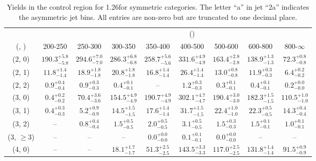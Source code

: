\begin{table}[h!]
\tiny
\centering
\caption{Yields in the \mj control region for 1.26\ifb for symmetric categories. The letter ``a'' in jet \eg ``2a''  indicates the asymmetric jet bins. All entries are non-zero but are truncated to one decimal place.\label{tab:yieldssep_mu_wjetstolnuht_sym}}
\begin{tabular}
{ccccccccc}
	\hline\hline
&	& \multicolumn{8}{c}{\scalht (\gev)} \\ 
	 (\njet,  \nb) & 200-250 & 250-300 & 300-350 & 350-400 & 400-500 & 500-600 & 600-800 & 800-$\infty$ \\ [0.8ex] 
\hline
	(2, 0) & $190.3^{+ 5.8 }_{- 5.8 }$ & $294.6^{+ 7.0 }_{- 7.0 }$ & $286.3^{+ 6.8 }_{- 6.8 }$ & $258.7^{+ 5.6 }_{- 5.6 }$ & $331.6^{+ 4.9 }_{- 4.9 }$ & $163.4^{+ 2.8 }_{- 2.8 }$ & $138.9^{+ 1.3 }_{- 1.3 }$ & $72.3^{+ 0.8 }_{- 0.8 }$ \\[0.5ex] 
	(2, 1) & $11.8^{+ 1.4 }_{- 1.4 }$ & $18.9^{+ 1.8 }_{- 1.8 }$ & $20.8^{+ 1.8 }_{- 1.8 }$ & $16.8^{+ 1.4 }_{- 1.4 }$ & $26.4^{+ 1.4 }_{- 1.4 }$ & $13.0^{+ 0.8 }_{- 0.8 }$ & $11.9^{+ 0.3 }_{- 0.3 }$ & $6.4^{+ 0.2 }_{- 0.2 }$ \\[0.5ex] 
	(2, 2) & $0.9^{+ 0.4 }_{- 0.4 }$ & $0.9^{+ 0.3 }_{- 0.3 }$ & $0.4^{+ 0.1 }_{- 0.1 }$ & -- & $1.2^{+ 0.3 }_{- 0.3 }$ & $0.3^{+ 0.1 }_{- 0.1 }$ & $0.4^{+ 0.1 }_{- 0.1 }$ & $0.2^{+ 0.0 }_{- 0.0 }$ \\[0.5ex] 
	(3, 0) & $0.4^{+ 0.2 }_{- 0.2 }$ & $70.4^{+ 3.6 }_{- 3.6 }$ & $154.5^{+ 4.9 }_{- 4.9 }$ & $190.7^{+ 4.9 }_{- 4.9 }$ & $302.1^{+ 4.7 }_{- 4.7 }$ & $190.4^{+ 3.0 }_{- 3.0 }$ & $182.3^{+ 1.5 }_{- 1.5 }$ & $110.5^{+ 1.0 }_{- 1.0 }$ \\[0.5ex] 
	(3, 1) & $0.4^{+ 0.3 }_{- 0.3 }$ & $5.2^{+ 0.9 }_{- 0.9 }$ & $14.5^{+ 1.5 }_{- 1.5 }$ & $17.6^{+ 1.4 }_{- 1.4 }$ & $31.7^{+ 1.5 }_{- 1.5 }$ & $22.4^{+ 1.0 }_{- 1.0 }$ & $22.3^{+ 0.5 }_{- 0.5 }$ & $14.3^{+ 0.4 }_{- 0.4 }$ \\[0.5ex] 
	(3, 2) & -- & $0.8^{+ 0.4 }_{- 0.4 }$ & $1.5^{+ 0.5 }_{- 0.5 }$ & $2.0^{+ 0.5 }_{- 0.5 }$ & $3.1^{+ 0.5 }_{- 0.5 }$ & $1.5^{+ 0.3 }_{- 0.3 }$ & $1.5^{+ 0.1 }_{- 0.1 }$ & $1.0^{+ 0.1 }_{- 0.1 }$ \\[0.5ex] 
	(3, $\ge3$) & -- & -- & -- & $0.0^{+ 0.0 }_{- 0.0 }$ & $0.1^{+ 0.1 }_{- 0.1 }$ & $0.0^{+ 0.0 }_{- 0.0 }$ & -- & -- \\[0.5ex] 
	(4, 0) & -- & -- & $18.1^{+ 1.7 }_{- 1.7 }$ & $51.3^{+ 2.5 }_{- 2.5 }$ & $143.5^{+ 3.3 }_{- 3.3 }$ & $117.0^{+ 2.5 }_{- 2.5 }$ & $131.8^{+ 1.4 }_{- 1.4 }$ & $91.5^{+ 0.9 }_{- 0.9 }$ \\[0.5ex] 

\end{tabular}
\end{table}

